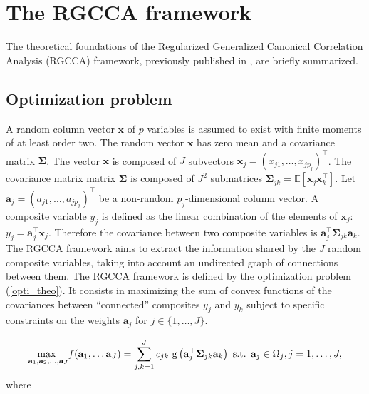 \documentclass[
]{jss}
\begin{document}
\hypertarget{the-rgcca-framework}{%
\section{The RGCCA framework}\label{the-rgcca-framework}}

The theoretical foundations of the Regularized Generalized Canonical
Correlation Analysis (RGCCA) framework, previously published in
\cite{Tenenhaus2011, Tenenhaus2014, Tenenhaus2015, Tenenhaus2017}, are
briefly summarized.

\hypertarget{optimization-problem}{%
\subsection{Optimization problem}\label{optimization-problem}}

A random column vector \(\boldsymbol x\) of \(p\) variables is assumed
to exist with finite moments of at least order two. The random vector
\(\boldsymbol x\) has zero mean and a covariance matrix
\(\mathbf \Sigma\). The vector \(\boldsymbol x\) is composed of \(J\)
subvectors \(\boldsymbol x_j = (x_{j1}, \ldots, x_{jp_j})^\top\). The
covariance matrix matrix \(\mathbf \Sigma\) is composed of \(J^2\)
submatrices
\(\mathbf \Sigma_{jk} = \mathbb{E}\left[\boldsymbol x_j \boldsymbol x_k^\top\right]\).
Let \(\mathbf a_j = (a_{j1}, \ldots, a_{jp_j})^\top\) be a non-random
\(p_j\)-dimensional column vector. A composite variable \(y_j\) is
defined as the linear combination of the elements of
\(\boldsymbol x_j\): \(y_j = \mathbf a_j^\top \boldsymbol x_j\).
Therefore the covariance between two composite variables is
\(\mathbf{a}_j^\top \mathbf \Sigma_{jk} \mathbf{a}_k\). The RGCCA
framework aims to extract the information shared by the \(J\) random
composite variables, taking into account an undirected graph of
connections between them. The RGCCA framework is defined by the
optimization problem (\ref{opti_theo}). It consists in maximizing the
sum of convex functions of the covariances between ``connected''
composites \(y_j\) and \(y_k\) subject to specific constraints on the
weights \(\mathbf a_j\) for \(j \in \{1, \ldots, J\}\).

\begin{equation}
\underset{\mathbf{a}_1, \mathbf{a}_2, \ldots,\mathbf{a}_J}{\text{max }}  f( \mathbf a_1, \ldots  \mathbf a_J) = \displaystyle  \sum_{j, k = 1}^J c_{jk} \text{
g}\left(\mathbf{a}_j^\top  \mathbf \Sigma_{jk} \mathbf{a}_k\right)\\
\text{ s.t. } \mathbf{a}_j \in \Omega_j, j =1, \ldots, J,
\label{opti_theo}
\end{equation} where
\end{document}
